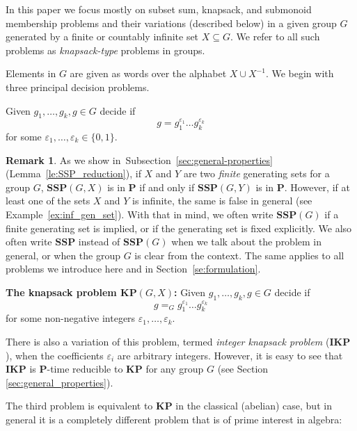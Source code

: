 \documentclass[11pt]{amsart}
\theoremstyle{definition}
\newtheorem{remark}[theorem]{Remark}
\def\P{{\mathbf{P}}}
\def\SSP{{\mathbf{SSP}}}
\def\KP{{\mathbf{KP}}}
\def\IKP{{\mathbf{IKP}}}
\begin{document}
In this paper we focus mostly on subset sum, knapsack, and submonoid membership problems and their variations (described below)  in a given group $G$ generated by a finite or countably infinite set  $X \subseteq G$. We refer to all such problems as {\it knapsack-type} problems in groups.

Elements in $G$ are given as words over the alphabet  $X \cup X^{-1}$.
We begin with three principal decision problems.

\medskip
\noindent{\bf The subset sum  problem $\SSP(G,X)$\index{$\SSP(G,X)$}:}
Given $g_1,\ldots,g_k,g\in G$ decide if
  \begin{equation} \label{eq:SSP-def}
  g = g_1^{\varepsilon_1} \ldots g_k^{\varepsilon_k}
  \end{equation}
for some $\varepsilon_1,\ldots,\varepsilon_k \in \{0,1\}$.

\begin{remark}
As we show in~Subsection~\ref{sec:general-properties} (Lemma~\ref{le:SSP_reduction}), if $X$ and $Y$ are two {\em finite} generating sets for a group $G$, $\SSP(G,X)$ is in $\P$ if and only if $\SSP(G,Y)$ is in $\P$. However, if at least one of the sets $X$ and $Y$ is infinite, the same is false in general (see Example~\ref{ex:inf_gen_set}).
With that in mind, we often write $\SSP(G)$ if a finite generating set is implied, or if the generating set is fixed explicitly. We also often write $\SSP$ instead of $\SSP(G)$ when we talk about the problem in general, or when the group $G$ is clear from the context. The same applies to all problems we introduce here and in Section~\ref{se:formulation}.
\end{remark}

\medskip
\noindent
{\bf The knapsack problem $\KP(G,X)$\index{$\KP(G,X)$}:}  Given $g_1,\ldots,g_k,g\in G$
decide if
\begin{equation}\label{eq:IKP-def}
g =_G g_1^{\varepsilon_1} \ldots g_k^{\varepsilon_k}
\end{equation}
for some  non-negative integers $\varepsilon_1,\ldots,\varepsilon_k$.


\medskip

There is also a variation of this problem, termed {\it integer knapsack problem} ($\IKP$), when the coefficients  $\varepsilon_i$ are arbitrary integers. However, it is easy to see that $\IKP$ is $\P$-time reducible to $\KP$ for any group $G$ (see Section   \ref{sec:general_properties}).

The third problem is equivalent to $\KP$ in the classical (abelian) case, but in general it is a completely different problem that is of prime  interest in algebra:
\end{document}
